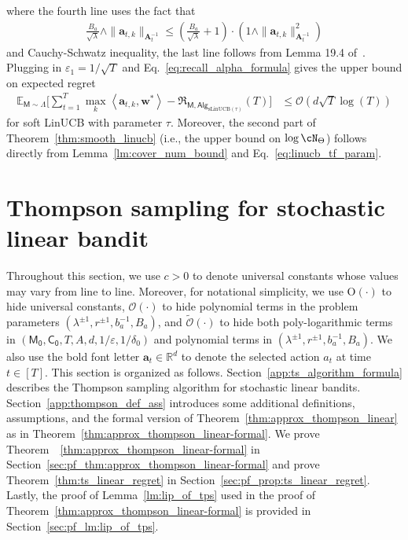 \documentclass[10pt]{article}
\newcommand{\eps}{\varepsilon}
\renewcommand{\cO}{\mathcal{O}}
\newcommand{\<}{\left\langle}
\renewcommand{\>}{\right\rangle}
\newcommand{\E}{\mathbb{E}}
\newcommand{\R}{\mathbb{R}}
\newcommand{\inst}{{\mathsf{M}}}
\newcommand{\sLinUCB}{{\mathrm{sLinUCB}}}
\newcommand{\temp}{{\tau}}
\newcommand{\Tpsparn}{{r}}
\newcommand{\tcO}{{\tilde{\mathcal O}}}
\newcommand{\action}{{a}}
\newcommand{\totlen}{{T}}
\newcommand{\sAlg}{{\mathsf{Alg}}}
\newcommand{\prior}{{\Lambda}}
\newcommand{\tfparspace}{{\Theta}}
\newcommand{\totreward}{{\mathfrak{R}}}
\newcommand{\conO}{{\mathrm{O}}}
\newcommand{\neuron}{{\mathsf{M_0}}}
\newcommand{\weightn}{{{\mathsf{C_0}}}}
\def\bA{{\mathbf A}}
\def\ba{{\mathbf a}}
\def\bw{{\mathbf w}}
\begin{document}
where the fourth line uses the fact that
\begin{align*}
 \frac{B_a}{\sqrt{\lambda}}\wedge\|\ba_{t,k}\|_{\bA^{-1}_t}\leq (\frac{B_a}{\sqrt{\lambda}}+1)\cdot(1\wedge\|\ba_{t,k}\|^2_{\bA^{-1}_t})
\end{align*}
and Cauchy-Schwatz inequality, the last line follows from Lemma 19.4 of~\cite{lattimore2020bandit}. Plugging in $\eps_1=1/\sqrt{T}$ and Eq.~\eqref{eq:recall_alpha_formula} gives the upper bound on expected regret
\begin{align*}
\E_{\inst\sim\prior}\Big[\sum_{t=1}^\totlen\max_{k}\<\ba_{t,k},\bw^*\>-\totreward_{\inst,\sAlg_{\sLinUCB(\temp)}}(\totlen)\Big]&\leq\cO(d\sqrt{T}\log(T))
\end{align*}
for soft LinUCB with parameter $\temp.$
Moreover, the second part of Theorem~\ref{thm:smooth_linucb} (i.e., the upper bound on $\log\cN_{\tfparspace}$) follows directly from Lemma~\ref{lm:cover_num_bound} and Eq.~\eqref{eq:linucb_tf_param}.
\section{Thompson sampling for stochastic linear bandit}\label{example:ts-app}
Throughout this section, we use $c>0$ to denote universal constants whose values may vary from line to line.
Moreover, for notational simplicity, we use $\conO(\cdot)$ to hide universal constants, $\cO(\cdot)$ to hide polynomial terms in the problem parameters  $(\lambda^{\pm1},\Tpsparn^{\pm1},b_a^{-1},B_a)$, and $\tcO(\cdot)$ to hide both poly-logarithmic terms in $(\neuron,\weightn,T,A,d,1/\eps,1/\delta_0)$ and polynomial terms in $(\lambda^{\pm1},\Tpsparn^{\pm1},b_a^{-1},B_a)$. We also use the bold font letter $\ba_t\in\R^d$ to denote the selected action $\action_t$ at time $t\in[\totlen]$.
This section is organized as follows. Section~\ref{app:ts_algorithm_formula} describes the Thompson sampling algorithm for stochastic linear bandits. Section~\ref{app:thompson_def_ass} introduces some additional definitions, assumptions, and the formal version of Theorem~\ref{thm:approx_thompson_linear} as in Theorem~\ref{thm:approx_thompson_linear-formal}.
We prove Theorem~~\ref{thm:approx_thompson_linear-formal} in Section~\ref{sec:pf_thm:approx_thompson_linear-formal} and prove Theorem~\ref{thm:ts_linear_regret} in Section~\ref{sec:pf_prop:ts_linear_regret}. Lastly, the proof of Lemma~\ref{lm:lip_of_tps} used in the proof of Theorem~\ref{thm:approx_thompson_linear-formal} is provided in Section~\ref{sec:pf_lm:lip_of_tps}.
\end{document}
